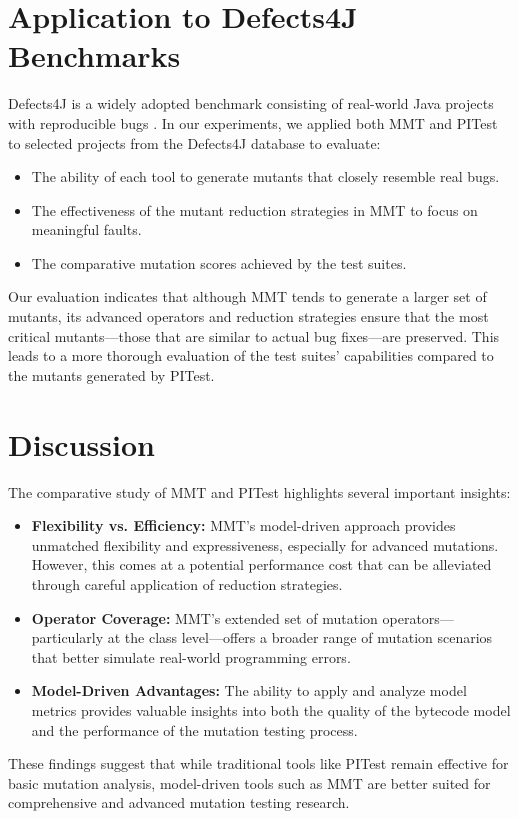 \documentclass[sigplan, nonacm]{acmart}
\begin{document}
\section{Application to Defects4J Benchmarks}
\label{sec:defects4j}
Defects4J is a widely adopted bench\-mark consisting of real-world Java projects with repro\-ducible bugs \cite{Defects4J}. In our experiments, we applied both MMT and PITest to selected projects from the Defects4J database to evaluate:
\begin{itemize}[noitemsep]
	\item The ability of each tool to generate mutants that closely resemble real bugs.
	\item The effectiveness of the mutant reduction strategies in MMT to focus on meaningful faults.
	\item The comparative mutation scores achieved by the test suites.
\end{itemize}
Our evaluation indicates that although MMT tends to generate a larger set of mutants, its advanced operators and reduction strategies ensure that the most critical mutants—those that are similar to actual bug fixes—are preserved. This leads to a more thorough evaluation of the test suites' capabilities compared to the mutants generated by PITest.

\section{Discussion}
The comparative study of MMT and PITest highlights several important insights:
\begin{itemize}[noitemsep]
	\item \textbf{Flexibility vs. Efficiency:} MMT’s model-driven approach provides unmatched flexibility and expressiveness, especially for advanced mutations. However, this comes at a potential performance cost that can be alleviated through careful application of reduction strategies.
	\item \textbf{Operator Coverage:} MMT’s extended set of mutation operators—particularly at the class level—offers a broader range of mutation scenarios that better simulate real-world programming errors.
	\item \textbf{Model-Driven Advantages:} The ability to apply and analyze model metrics provides valuable insights into both the quality of the bytecode model and the performance of the mutation testing process.
\end{itemize}
These findings suggest that while traditional tools like PITest remain effective for basic mutation analysis, model-driven tools such as MMT are better suited for comprehensive and advanced mutation testing research.
\end{document}
